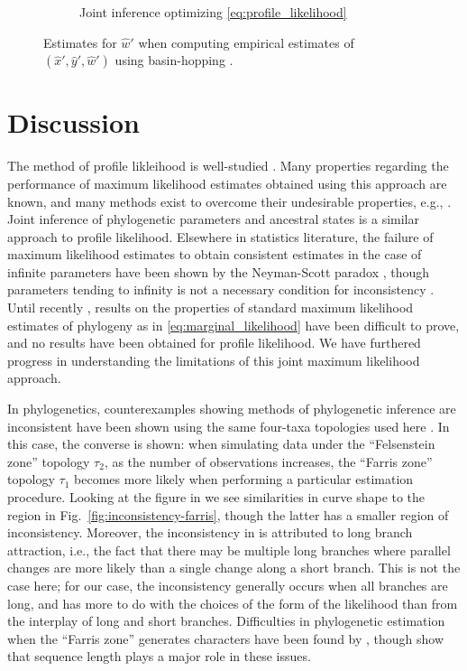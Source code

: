 \documentclass{article}
\begin{document}
\begin{figure}
\begin{subfigure}{.45\linewidth}
\caption[short]{Joint inference optimizing \eqref{eq:profile_likelihood}}
\end{subfigure}
\caption{
    Estimates for $\hat{w}'$ when computing empirical estimates of $(\hat{x}', \hat{y}', \hat{w}')$ using basin-hopping \cite{Wales1997}.
}
\label{fig:bl-general-inconsistency}
\end{figure}

\section*{Discussion}

The method of profile likleihood is well-studied \cite{Murphy2000-ry}.
Many properties regarding the performance of maximum likelihood estimates obtained using this approach are known, and many methods exist to overcome their undesirable properties, e.g., \cite{Geman1982}.
Joint inference of phylogenetic parameters and ancestral states \cite{Sagulenko2017-jo} is a similar approach to profile likelihood.
Elsewhere in statistics literature, the failure of maximum likelihood estimates to obtain consistent estimates in the case of infinite parameters have been shown by the Neyman-Scott paradox \cite{Neyman1948-tt}, though parameters tending to infinity is not a necessary condition for inconsistency \cite{LeCam1990}.
Until recently \cite{RoyChoudhury2015-ta}, results on the properties of standard maximum likelihood estimates of phylogeny as in \eqref{eq:marginal_likelihood} have been difficult to prove, and no results have been obtained for profile likelihood.
We have furthered progress in understanding the limitations of this joint maximum likelihood approach.

In phylogenetics, counterexamples showing methods of phylogenetic inference are inconsistent have been shown using the same four-taxa topologies used here \cite{Felsenstein1978-rr}.
In this case, the converse is shown: when simulating data under the ``Felsenstein zone'' topology $\tau_2$, as the number of observations increases, the ``Farris zone'' topology $\tau_1$ becomes more likely when performing a particular estimation procedure.
Looking at the figure in \cite{Felsenstein1978-rr} we see similarities in curve shape to the region in Fig.~\ref{fig:inconsistency-farris}, though the latter has a smaller region of inconsistency.
Moreover, the inconsistency in \cite{Felsenstein1978-rr} is attributed to long branch attraction, i.e., the fact that there may be multiple long branches where parallel changes are more likely than a single change along a short branch.
This is not the case here; for our case, the inconsistency generally occurs when all branches are long, and has more to do with the choices of the form of the likelihood than from the interplay of long and short branches.
Difficulties in phylogenetic estimation when the ``Farris zone'' generates characters have been found by \cite{Siddall1998-hq}, though \cite{Swofford2001-hr} show that sequence length plays a major role in these issues.
\end{document}
